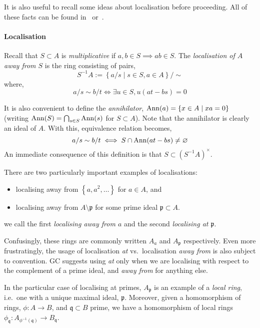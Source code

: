 \documentclass[000-main.tex]{subfiles}
\begin{document}
It is also useful to recall some ideas about localisation before proceeding.
All of these facts can be found in~\cite[][81-86]{altmanTermCommutativeAlgebra2013} or~\cite[][36-49]{atiyahIntroductionCommutativeAlgebra2000}.

\paragraph{Localisation}

Recall that $S\subset A$ is \emph{multiplicative} if $a, b\in S \implies ab\in S$.
The \emph{localisation of $A$ away from $S$} is the ring consisting of pairs,
\begin{displaymath}
  S^{-1}A := \left\{ a/s \mid s\in S, a\in A \right\}/\sim
\end{displaymath}
where,
\begin{displaymath}
  a/s \sim b/t \iff
  \exists u\in S, u(at - bs) = 0
\end{displaymath}

It is also convenient to define the \emph{annihilator}, $\operatorname{Ann}(a) = \left\{ x\in A \mid xa = 0 \right\}$ (writing $\operatorname{Ann}(S) = \bigcap_{s\in S}\operatorname{Ann}(s)$ for $S\subset A$).
Note that the annihilator is clearly an ideal of $A$.
With this, equivalence relation becomes,
\begin{displaymath}
  a/s \sim b/t \iff
  S\cap\operatorname{Ann}(at - bs) \neq \varnothing
\end{displaymath}
An immediate consequence of this definition is that $S\subset {(S^{-1}A)}^{\times}$.

There are two particularly important examples of localisations:
\begin{itemize}
  \item localising away from $\left\{a, a^2, \ldots \right\}$ for $a\in A$, and
  \item localising away from $A\setminus\mathfrak{p}$ for some prime ideal $\mathfrak{p}\subset A$.
\end{itemize}
we call the first \emph{localising away from $a$} and the second \emph{localising at $\mathfrak{p}$}.

Confusingly, these rings are commonly written $A_a$ and $A_{\mathfrak{p}}$ respectively.
Even more frustratingly, the usage of localisation \emph{at} vs.\ localisation \emph{away from} is also subject to convention.
GC suggests using \emph{at} only when we are localising with respect to the complement of a prime ideal, and \emph{away from} for anything else.

In the particular case of localising at primes, $A_\mathfrak{p}$ is an example of a \emph{local ring}, i.e.\ one with a unique maximal ideal, $\mathfrak{p}$.
Moreover, given a homomorphism of rings, $\phi : A \to B$, and $\mathfrak{q}\subset B$ prime, we have a homomorphism of local rings $\phi_{\mathfrak{q}} : A_{\phi^{-1}(\mathfrak{q})} \to B_{\mathfrak{q}}$.
\end{document}
